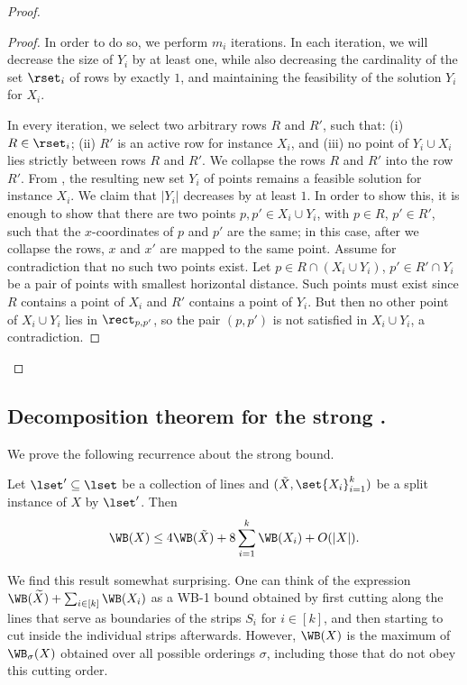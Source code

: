 \documentclass{toc}
\begin{document}
\begin{proof}
\begin{proof}
                In order to do so, we perform $m_i$ iterations. In each iteration, we will decrease the size of $Y_i$ by at least one, while also decreasing the cardinality of the set $\rset_i$ of rows by exactly $1$, and maintaining the feasibility of the solution $Y_i$ for $X_i$.  
                
                In every iteration, we select two arbitrary rows $R$ and $R'$, such that: (i) $R\in \rset_i$; (ii) $R'$ is an active row for instance $X_i$, and (iii) no point of $Y_i\cup X_i$ lies strictly between rows $R$ and $R'$. 
                We collapse the rows $R$ and $R'$ into the row $R'$. 
From , the resulting new set $Y_i$ of points remains a feasible solution for instance $X_i$. 
We claim that $|Y_i|$ decreases by at least $1$. In order to show this, it is enough to show that there are two points $p,p'\in X_i\cup Y_i$, with $p\in R$, $p'\in R'$, such that the $x$-coordinates of $p$ and $p'$ are the same; in this case, after we collapse the rows, $x$ and $x'$ are mapped to the same point. Assume for contradiction that no such two points exist. Let $p\in R\cap (X_i\cup Y_i)$, $p'\in R'\cap Y_i$ be a pair of points with smallest horizontal distance. Such points must exist since $R$ contains a point of $X_i$ and $R'$ contains a point of $Y_i$. But then no other point of  $X_i\cup Y_i$ lies in $\rect_{p,p'}$, so the pair $(p,p')$ is not satisfied in $X_i\cup Y_i$, a contradiction.
%
%
%
%
%
\end{proof}
%
\end{proof}



%
%
%
%
\subsection{Decomposition theorem for the strong \WBone.}
\label{thm: wb}
%
%
We prove the following recurrence about the strong \WBone bound. 
%
%
%


\begin{theorem}\label{thm: WB for corner and strip instances}
%
%
        Let $\lset' \subseteq \lset$ be a collection of lines and $(\tilde{X}, \set{X_i}_{i=1}^k)$ be a split instance of $X$ by $\lset'$. Then 
	$$\WB(X)\leq 4\WB(\tilde{X})+8\sum_{i=1}^k\WB(X_i)+O(|X|).   $$
\end{theorem}


We find this result somewhat surprising. 
One can think of the expression $\WB(\widetilde{X})+\sum_{i \in [k]}\WB(X_i)$ as a WB-1 bound obtained by first cutting along the lines that serve as boundaries of the strips $S_i$ for $i \in [k]$, and then starting to cut inside the individual strips afterwards. However, $\WB(X)$ is the maximum of $\WB_{\sigma}(X)$ obtained over all possible orderings $\sigma$, including those that do not obey this cutting order. %
%
\end{document}

